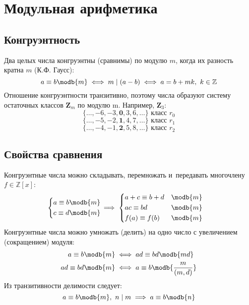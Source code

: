 \section{Модульная арифметика}

\subsection{Конгруэнтность}

Два целых числа {\bold конгруэнтны} {\ital\color{desc} (сравнимы)} по модулю $m$, когда их разность кратна $m$ {\ital\color[HTML]{888888} (К.Ф. Гаусс)}:
$$a\equiv b\modb{m}\iff m\mid(a-b)\iff a=b+mk,\ k\in\mathbb{Z}$$
Отношение конгруэнтности {\ital транзитивно}, поэтому числа образуют {\ital систему остаточных классов} $\symbf{Z}_m$ по модулю {\ital m}. Например, $\symbf{Z}_3$:
$$\{\ldots, -6, -3, \symbf{0}, 3, 6,\ldots\}\text{ класс }r_0$$
$$\{\ldots, -5, -2, \symbf{1}, 4, 7,\ldots\}\text{ класс }r_1$$
$$\{\ldots, -4, -1, \symbf{2}, 5, 8,\ldots\}\text{ класс }r_2$$

\subsection{Свойства сравнения}

Конгруэнтные числа можно {\ital складывать}, {\ital перемножать} и~передавать {\ital многочлену} $f\in\mathbb{Z}[x]$:
$$\begin{cases}
\begin{aligned}
a\equiv b&\modb{m}\\
c\equiv d&\modb{m}\\
\end{aligned}
\end{cases}
\hspace*{-12pt}\implies
\begin{cases}
\begin{aligned}
&a + c\equiv b + d &\modb{m}\\
&ac\equiv bd &\modb{m}\\
&f(a)\equiv f(b) &\modb{m}
\end{aligned}
\end{cases}$$
Конгруэнтные числа можно {\ital умножать {\color{desc}(делить)}} на одно число с {\ital увеличением {\color{desc}(сокращением)}} модуля:
\begin{align*}
a\equiv b\modb{m}&\iff ad\equiv bd\modb{md}\\
ad\equiv bd\modb{m}&\iff a\equiv b\modb{\frac{m}{(m,d)}}
\end{align*}
Из транзитивности делимости следует:
$$a\equiv b\modb{m},\ n\mid m\implies a\equiv b\modb{n}$$

